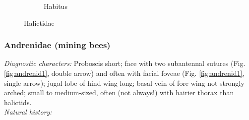 \documentclass[letterpaper, 11pt]{article}
\begin{document}
\begin{figure}[ht!]
\begin{subfigure}[ht!]{0.4\textwidth}
        \caption{Habitus \citep[][Fig. 118]{goulet1993hymenoptera}}
        \label{fig:halict2}
    \end{subfigure}
    \caption{Halictidae}\label{fig:halictidae}
\end{figure}

\subsubsection{Andrenidae (mining bees)}
\noindent{}\textit{Diagnostic characters:} Proboscis short; face with two subantennal sutures (Fig. \ref{fig:andrenid1}, double arrow) and often with facial foveae (Fig. \ref{fig:andrenid1}, single arrow); jugal lobe of hind wing long; basal vein of fore wing not strongly arched; small to medium-sized, often (not always!) with hairier thorax than halictids.\\

\noindent{}\textit{Natural history:} \\
\end{document}

